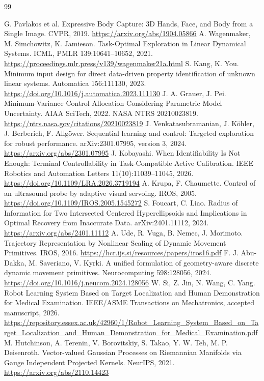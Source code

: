 \documentclass[11pt,a4paper]{article}
\numberwithin{equation}{section}
\theoremstyle{definition}
\begin{document}
\begin{thebibliography}{99}
\small\raggedright\setlength{\itemsep}{4pt}\setlength{\parskip}{0pt}
 G. Pavlakos et al. Expressive Body Capture: 3D Hands, Face, and Body from a Single Image. CVPR, 2019. \url{https://arxiv.org/abs/1904.05866}
 A. Wagenmaker, M. Simchowitz, K. Jamieson. Task-Optimal Exploration in Linear Dynamical Systems. ICML, PMLR 139:10641--10652, 2021. \url{https://proceedings.mlr.press/v139/wagenmaker21a.html}
 S. Kang, K. You. Minimum input design for direct data-driven property identification of unknown linear systems. Automatica 156:111130, 2023. \url{https://doi.org/10.1016/j.automatica.2023.111130}
 J. A. Grauer, J. Pei. Minimum-Variance Control Allocation Considering Parametric Model Uncertainty. AIAA SciTech, 2022. NASA NTRS 20210023819. \url{https://ntrs.nasa.gov/citations/20210023819}
 J. Venkatasubramanian, J. K\"ohler, J. Berberich, F. Allg\"ower. Sequential learning and control: Targeted exploration for robust performance. arXiv:2301.07995, version 3, 2024. \url{https://arxiv.org/abs/2301.07995}
 J. Kobayashi. When Identifiability Is Not Enough: Terminal Controllability in Task-Compatible Active Calibration. IEEE Robotics and Automation Letters 11(10):11039--11045, 2026. \url{https://doi.org/10.1109/LRA.2026.3719194}
 A. Krupa, F. Chaumette. Control of an ultrasound probe by adaptive visual servoing. IROS, 2005. \url{https://doi.org/10.1109/IROS.2005.1545272}
 S. Foucart, C. Liao. Radius of Information for Two Intersected Centered Hyperellipsoids and Implications in Optimal Recovery from Inaccurate Data. arXiv:2401.11112, 2024. \url{https://arxiv.org/abs/2401.11112}
 A. Ude, R. Vuga, B. Nemec, J. Morimoto. Trajectory Representation by Nonlinear Scaling of Dynamic Movement Primitives. IROS, 2016. \url{https://hcr.ijs.si/resources/papers/iros16.pdf}
 F. J. Abu-Dakka, M. Saveriano, V. Kyrki. A unified formulation of geometry-aware discrete dynamic movement primitives. Neurocomputing 598:128056, 2024. \url{https://doi.org/10.1016/j.neucom.2024.128056}
 W. Si, Z. Jin, N. Wang, C. Yang. Robot Learning System Based on Target Localization and Human Demonstration for Medical Examination. IEEE/ASME Transactions on Mechatronics, accepted manuscript, 2026. \url{https://repository.essex.ac.uk/42960/1/Robot_Learning_System_Based_on_Target_Localization_and_Human_Demonstration_for_Medical_Examination.pdf}
 M. Hutchinson, A. Terenin, V. Borovitskiy, S. Takao, Y. W. Teh, M. P. Deisenroth. Vector-valued Gaussian Processes on Riemannian Manifolds via Gauge Independent Projected Kernels. NeurIPS, 2021. \url{https://arxiv.org/abs/2110.14423}


\end{thebibliography}
\end{document}
